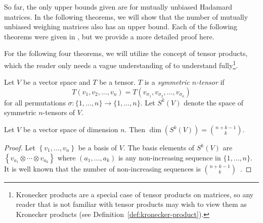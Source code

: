 % 
% 


So far, the only upper bounds given are for mutually unbiased Hadamard matrices. In the following theorems, we will show that the number of mutually unbiased weighing matrices also has an upper bound. Each of the following theorems were given in \cite{calderbank97}, but we provide a more detailed proof here.

For the following four theorems, we will utilize the concept of tensor products, which the reader only needs a vague understanding of to understand fully\footnote{Kronecker products are a special case of tensor products on matrices, so any reader that is not familiar with tensor products may wish to view them as Kronecker products (see Definition~\ref{def:kronecker-product}).}.

\begin{definition} \label{def:n-tensor}
 Let $V$ be a vector space and $T$ be a tensor. $T$ is a {\it symmetric $n$-tensor} if $$T(v_1,v_2,\dots,v_n)=T(v_{\sigma_1},v_{\sigma_2},\dots,v_{\sigma_n})$$ for all permutations $\sigma:\{1,\dots,n\}\rightarrow\{1,\dots,n\}$. Let $S^k(V)$ denote the space of symmetric $n$-tensors of $V$.
\end{definition}

\begin{lemma} \label{lem:dim_n-tensor}
 Let $V$ be a vector space of dimension $n$. Then $\dim\left(S^k(V)\right) = \binom{n+k-1}{k}$.
 \begin{proof}
  Let $\left\{v_1,\dots,v_n\right\}$ be a basis of $V$. The basis elements of $S^k(V)$ are $\left\{v_{a_1} \otimes \cdots \otimes v_{a_k} \right\}$ where $(a_1,\dots,a_k)$ is any non-increasing sequence in $\{1,\dots,n\}$. It is well known that the number of non-increasing sequences is $\binom{n+k-1}{k}$~\cite{star-bar}.
 \end{proof}

\end{lemma}

